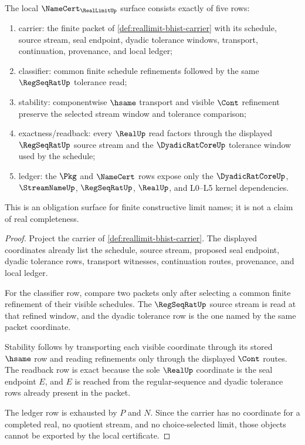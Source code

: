 \begin{theorem}
\label{thm:reallimit-namecert-obligation-surface}
The local $\NameCert_{\RealLimitUp}$ surface consists exactly of five rows:
\begin{enumerate}
\item carrier: the finite packet of
\autoref{def:reallimit-bhist-carrier} with its schedule, source stream,
seal endpoint, dyadic tolerance windows, transport, continuation, provenance,
and local ledger;
\item classifier: common finite schedule refinements followed by the same
$\RegSeqRatUp$ tolerance read;
\item stability: componentwise $\hsame$ transport and visible $\Cont$
refinement preserve the selected stream window and tolerance comparison;
\item exactness/readback: every $\RealUp$ read factors through the displayed
$\RegSeqRatUp$ source stream and the $\DyadicRatCoreUp$ tolerance window used by
the schedule;
\item ledger: the $\Pkg$ and $\NameCert$ rows expose only the
$\DyadicRatCoreUp$, $\StreamNameUp$, $\RegSeqRatUp$, $\RealUp$, and L0--L5
kernel dependencies.
\end{enumerate}
This is an obligation surface for finite constructive limit names; it is not a
claim of real completeness.
\end{theorem}
\begin{proof}
Project the carrier of \autoref{def:reallimit-bhist-carrier}. The displayed
coordinates already list the schedule, source stream, proposed seal endpoint,
dyadic tolerance rows, transport witnesses, continuation routes, provenance,
and local ledger.

For the classifier row, compare two packets only after selecting a common finite
refinement of their visible schedules. The $\RegSeqRatUp$ source stream is read
at that refined window, and the dyadic tolerance row is the one named by the
same packet coordinate.

Stability follows by transporting each visible coordinate through its stored
$\hsame$ row and reading refinements only through the displayed $\Cont$ routes.
The readback row is exact because the sole $\RealUp$ coordinate is the seal
endpoint $E$, and $E$ is reached from the regular-sequence and dyadic tolerance
rows already present in the packet.

The ledger row is exhausted by $P$ and $N$. Since the carrier has no coordinate
for a completed real, no quotient stream, and no choice-selected limit, those
objects cannot be exported by the local certificate.
\end{proof}

